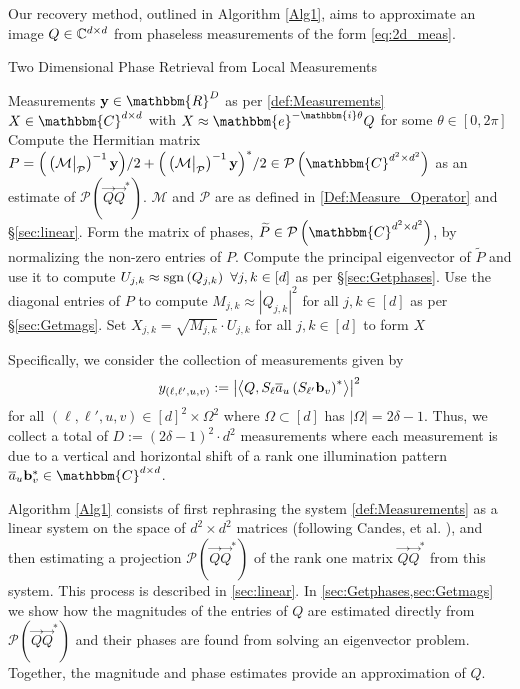 Our recovery method, outlined in Algorithm \ref{Alg1}, aims to approximate an image $Q\in \mathbb{C}^{d\times d}$ from phaseless measurements of the form \eqref{eq:2d_meas}.
%
%
\begin{algorithm}[htbp]
\renewcommand{\algorithmicrequire}{\textbf{Input:}}
\renewcommand{\algorithmicensure}{\textbf{Output:}}
\caption{Two Dimensional Phase Retrieval from Local Measurements}
\label{Alg1}
\begin{algorithmic}[1]
    \REQUIRE Measurements $\y\in \mathbbm{R}^D$ as per \eqref{def:Measurements}
    \ENSURE $X \in \mathbbm{C}^{d \times d}$ with $X \approx \mathbbm{e}^{-\mathbbm{i} \theta} Q$ for some $\theta \in [0, 2 \pi]$ 
    \STATE Compute the Hermitian matrix $P = \Big( \left(\mathcal{M} \big|_{\mathcal{P}}\right)^{-1} {\bf y}\Big)/2 + \Big( \left(\mathcal{M} \big|_{\mathcal{P}}\right)^{-1} {\bf y}\Big)^*/2  \in \mathcal{P}\left(\mathbbm{C}^{d^2\times d^2}\right)$ as an estimate of $\mathcal{P} \left( \vec{Q} \vec{Q}^* \right)$.  $\mathcal{M}$ and $\mathcal{P}$ are as defined in \eqref{Def:Measure_Operator} and \S\ref{sec:linear}.
    \STATE Form the matrix of phases, $\widetilde{P} \in \mathcal{P}\left(\mathbbm{C}^{d^2\times d^2}\right)$, by normalizing the non-zero entries of $P$.
    \STATE Compute the principal eigenvector of $\widetilde{P}$ and use it to compute $U_{j,k} \approx \operatorname{sgn}\left( Q_{j,k}\right) ~\forall j,k \in [d]$ as per \S\ref{sec:Getphases}.
    \STATE Use the diagonal entries of $P$ to compute $M_{j,k} \approx \left| Q_{j,k} \right|^2$ for all $j,k \in [d]$ as per \S\ref{sec:Getmags}.
    \STATE Set $X_{j,k} = \sqrt{M_{j,k}} \cdot U_{j,k}$ for all $j,k \in [d]$ to form $X$
    \end{algorithmic}
\end{algorithm}
%
%
%
Specifically, we consider the collection of measurements given by 
\begin{equation}
y_{(\ell,\ell',u,v)} := \left| \left\langle Q, S_{\ell} \overline{a}_u \left(S_{\ell'} \mathbf b_v \right)^* \right\rangle \right|^2
\label{def:Measurements}
\end{equation}
for all $(\ell,\ell',u,v) \in [d]^2 \times\Omega^2$ where $\Omega \subset [d]$ has $|\Omega| = 2\delta-1$.  Thus, we collect a total of $D := (2\delta-1)^2 \cdot d^2 $ measurements where each measurement is due to a vertical and horizontal shift of a rank one illumination pattern $\a_u \b_v^* \in \mathbbm{C}^{d \times d}$.

Algorithm \ref{Alg1} consists of first rephrasing the system \eqref{def:Measurements} as a linear system on the space of $d^2 \times d^2$ matrices (following Candes, et al. \cite{candes2011phaselift}), and then estimating a projection $\mathcal{P}( \vec{Q}\vec{Q}^*)$ of the rank one matrix $\vec{Q}\vec{Q}^*$ from this system.  This process is described in \cref{sec:linear}.  In \cref{sec:Getphases,sec:Getmags} we show how the magnitudes of the entries of $Q$ are estimated directly from $\mathcal{P}(\vec{Q}\vec{Q}^*)$ and their phases are found from solving an eigenvector problem.  Together, the magnitude and phase estimates provide an approximation of $Q$.

